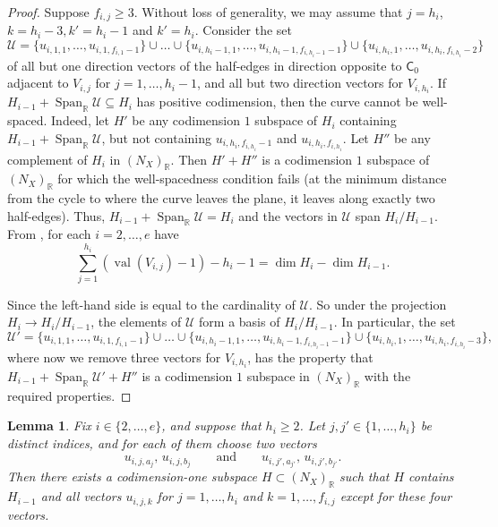 \documentclass{article}
\def\R{\mathbb{R}}
\newtheorem{lemma}[definition]{Lemma}
\newcommand{\tropC}{\mathsf{C}}
\newcommand{\val}[1]{\operatorname{val}(#1)}
\newcommand{\Span}{\operatorname{Span}_{\mathbb{R}}}
\begin{document}
\begin{proof}
Suppose $f_{i,j} \geq 3$. Without loss of generality, we may assume that $j= h_i$, $k=h_i-3,k'=h_i-1$ and $k'=h_i$. Consider the set 
\begin{equation} \label{eqn: basis vectors}
\mathcal{U} = \{u_{i,1,1}, \ldots, u_{i,1,f_{i,1}-1}\} \cup  \ldots \cup\{ u_{i,h_i-1,1}, \ldots, u_{i,h_i-1,f_{i,h_i-1}-1}\} \cup \{u_{i, h_i,1}, \ldots, u_{i,h_i, f_{i,h_i}-2}\}
\end{equation}
of all but one direction vectors of the half-edges in direction opposite to $\tropC_0$ adjacent to $V_{i,j}$ for $j = 1, \ldots, h_i -1$, and all but two direction vectors for $V_{i,h_i}$. If $H_{i-1} + \Span\mathcal{U} \subseteq H_{i}$ has positive codimension, then the curve cannot be well-spaced. Indeed, let $H'$ be any codimension $1$ subspace of $H_{i}$ containing $H_{i-1} + \Span\mathcal{U}$, but not containing $u_{i,h_i, f_{i,h_i}-1}$ and $ u_{i,h_i, f_{i,h_i}}$. Let $H''$ be any complement of $H_{i}$ in $(N_X)_{\mathbb{R}}$. Then $H'+ H''$ is a codimension $1$ subspace of $(N_X)_{\mathbb{R}}$ for which the well-spacedness condition fails (at the minimum distance from the cycle to where the curve leaves the plane, it leaves along exactly two half-edges). Thus, $H_{i-1} + \Span\mathcal{U} = H_{i}$ and the vectors in $\mathcal{U}$ span $H_i/H_{i-1}$. 
From \cite[Proposition 3.2.18(c)]{Tor14}, for each $i = 2, \ldots, e$  have 
    \begin{equation} \label{eqn: tor c}
        \sum_{j=1}^{h_i} (\val{V_{i,j}}-1) - h_i - 1 = \dim H_{i} - \dim H_{i-1}. 
    \end{equation}

Since the left-hand side is equal to the cardinality of $\mathcal{U}$. 
So under the projection $H_{i} \rightarrow H_{i}/H_{i-1}$, the elements of $\mathcal{U}$ form a basis of $H_{i}/H_{i-1}$. In particular, the set 
$$\mathcal{U}' = \{u_{i,1,1}, \ldots, u_{i,1,f_{i,1}-1}\} \cup  \ldots \cup\{ u_{i,h_i-1,1}, \ldots, u_{i,h_i-1,f_{i,h_i-1}-1}\} \cup \{u_{i, h_i,1}, \ldots, u_{i,h_i, f_{i,h_i}-3}\},$$
where now we remove three vectors for $V_{i,h_i}$, has the property that $H_{i-1} + \Span \mathcal{U}' + H''$ is a codimension $1$ subspace in $(N_X)_\R$ with the required properties.

\end{proof}



\begin{lemma}\label{lemma: all_but_4_vect}
    Fix $i \in \{2, \ldots, e\}$, and suppose that $h_i \geq 2$. Let $j,j' \in \{1, \ldots, h_i\}$ be distinct indices, and for each of them choose two vectors 
\[
u_{i,j,a_j}, \, u_{i,j,b_j}
\qquad\text{and}\qquad
u_{i,j',a_{j'}}, \, u_{i,j',b_{j'}}.
\]
Then there exists a codimension-one subspace
$
H \subset (N_X)_{\mathbb{R}}
$
such that $H$ contains $H_{i-1}$ and all vectors $u_{i,j,k}$ for $j=1,\ldots , h_i$ and $k=1,\ldots, f_{i,j}$ except for these four vectors.
\end{lemma}
\end{document}
